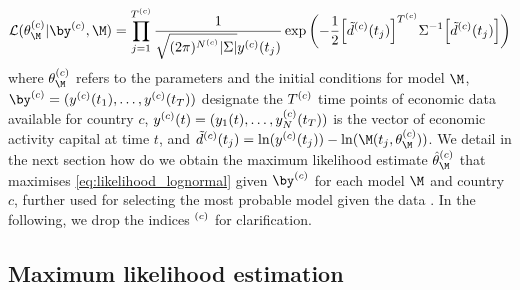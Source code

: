 \begin{equation}\label{eq:likelihood_lognormal}
  \LL(\theta\hc_\M | {\by\hc }, \M) = \prod_{j=1}^{T\hc} \frac{1}{\sqrt{(2\pi)^{N\hc}|\Sigma|} y\hc(t_j)} \exp \left(-\frac{1}{2} \Big[ \tilde{d}\hc(t_j)\Big]^{T\hc} \Sigma^{-1} \Big[ \tilde{d}\hc(t_j)\Big] \right)
\end{equation}
% 
where $\theta\hc_\M$ refers to the parameters and the initial conditions for model $\M$, $\by\hc = (y\hc(t_1), \allowbreak \dots, y\hc(t_T))$  designate the $T^{(c)}$ time points of economic data available for country $c$, $ y^{(c)}(t) = (y_1(t), \dots, y^{(c)}_N(t_T))$ is the vector of economic activity capital at time $t$, and $\tilde{d}\hc(t_j) = \ln(y\hc(t_j)) - \ln(\M(t_j,\theta\hc_\M))$. 
% 
We detail in the next section how do we obtain the maximum likelihood estimate $\hat\theta\hc_\M$ that maximises \cref{eq:likelihood_lognormal} given $\by\hc$ for each model $\M$ and country $c$, further used for selecting the most probable model given the data \citep{Burnham2002}. In the following, we drop the indices $^{(c)}$ for clarification.

\subsection{Maximum likelihood estimation}\label{parameter-inference}

